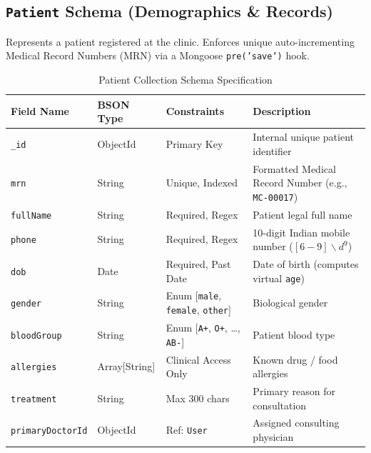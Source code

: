 \documentclass[12pt,a4paper,oneside]{report}
\begin{document}
\subsection{\texttt{Patient} Schema (Demographics \& Records)}
Represents a patient registered at the clinic. Enforces unique auto-incrementing Medical Record Numbers (MRN) via a Mongoose \texttt{pre('save')} hook.
\begin{table}[h!]
\centering
\caption{Patient Collection Schema Specification}
\small
\begin{tabularx}{\textwidth}{l l l X}
\toprule
\textbf{Field Name} & \textbf{BSON Type} & \textbf{Constraints} & \textbf{Description} \\
\midrule
\texttt{\_id} & ObjectId & Primary Key & Internal unique patient identifier \\
\texttt{mrn} & String & Unique, Indexed & Formatted Medical Record Number (e.g., \texttt{MC-00017}) \\
\texttt{fullName} & String & Required, Regex & Patient legal full name \\
\texttt{phone} & String & Required, Regex & 10-digit Indian mobile number ($[6-9]\backslash d^9$) \\
\texttt{dob} & Date & Required, Past Date & Date of birth (computes virtual \texttt{age}) \\
\texttt{gender} & String & Enum [\texttt{male}, \texttt{female}, \texttt{other}] & Biological gender \\
\texttt{bloodGroup} & String & Enum [\texttt{A+}, \texttt{O+}, \dots, \texttt{AB-}] & Patient blood type \\
\texttt{allergies} & Array[String] & Clinical Access Only & Known drug / food allergies \\
\texttt{treatment} & String & Max 300 chars & Primary reason for consultation \\
\texttt{primaryDoctorId}& ObjectId & Ref: \texttt{User} & Assigned consulting physician \\
\bottomrule
\end{tabularx}
\end{table}
\end{document}
